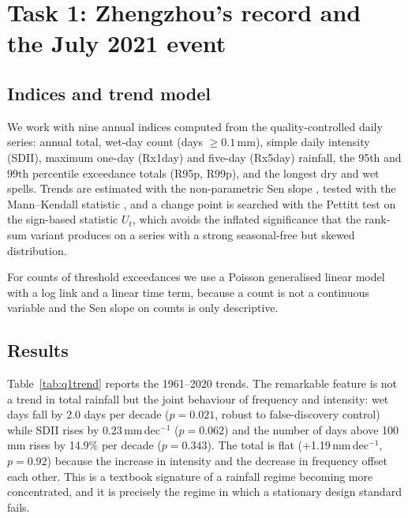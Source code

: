 \section{Task 1: Zhengzhou's record and the July 2021 event}\label{sec:q1}

\subsection{Indices and trend model}

We work with nine annual indices computed from the quality-controlled daily series: annual total, wet-day count (days $\ge0.1$\,mm), simple daily intensity (SDII), maximum one-day (Rx1day) and five-day (Rx5day) rainfall, the 95th and 99th percentile exceedance totals (R95p, R99p), and the longest dry and wet spells. Trends are estimated with the non-parametric Sen slope \cite{sen1968}, tested with the Mann--Kendall statistic \cite{mann1945}, and a change point is searched with the Pettitt test \cite{pettitt1979} on the sign-based statistic $U_t$, which avoids the inflated significance that the rank-sum variant produces on a series with a strong seasonal-free but skewed distribution.

For counts of threshold exceedances we use a Poisson generalised linear model with a log link and a linear time term, because a count is not a continuous variable and the Sen slope on counts is only descriptive.

\subsection{Results}

Table~\ref{tab:q1trend} reports the 1961--2020 trends. The remarkable feature is not a trend in total rainfall but the joint behaviour of frequency and intensity: wet days fall by 2.0 days per decade ($p=0.021$, robust to false-discovery control) while SDII rises by 0.23\,mm\,dec$^{-1}$ ($p=0.062$) and the number of days above 100\,mm rises by 14.9\% per decade ($p=0.343$). The total is flat (+1.19\,mm\,dec$^{-1}$, $p=0.92$) because the increase in intensity and the decrease in frequency offset each other. This is a textbook signature of a rainfall regime becoming more concentrated, and it is precisely the regime in which a stationary design standard fails.

